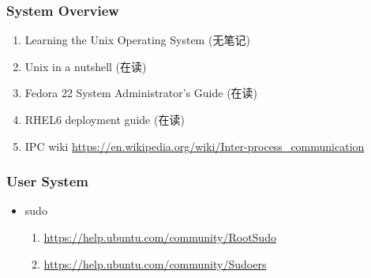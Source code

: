 \documentclass{article}
\begin{document}
\subsubsection{System Overview}
\begin{enumerate}
    \item Learning the Unix Operating System (无笔记)
    \item Unix in a nutshell (在读)
    \item Fedora 22 System Administrator's Guide (在读)
    \item RHEL6 deployment guide (在读)
    \item IPC wiki \url{https://en.wikipedia.org/wiki/Inter-process_communication}
\end{enumerate}
%
\subsubsection{User System}
%
\begin{itemize}
    \item sudo
        \begin{enumerate}
            \item \url{https://help.ubuntu.com/community/RootSudo}
            \item \url{https://help.ubuntu.com/community/Sudoers}
        \end{enumerate}
\end{itemize}
%
\end{document}

